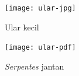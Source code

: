 \kant[16]
\begin{figure}[H]
	\centering  
	\texttt{[image: ular-jpg]}  
	\caption[Ular kecil]{Ular kecil} 
	\label{fig:ularjpg} 
\end{figure} 
\kant[17-19]

\begin{figure}[h] 
	\centering  
	\texttt{[image: ular-pdf]}  
	\caption[ {\it Serpentes} betina]{ {\it Serpentes} jantan} 
	\label{fig:ularpdf} 
\end{figure} 
 
